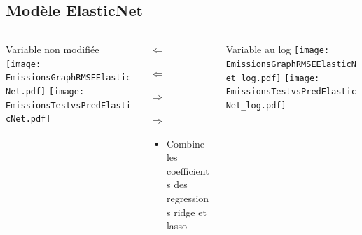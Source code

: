 \documentclass[8pt,aspectratio=169,hyperref={unicode=true}]{beamer}
\begin{document}
\subsection{Modèle ElasticNet}
\begin{frame}{\insertsubsection}
  \begin{columns}[t]
    \begin{column}{.33\textwidth}
      \centering Variable non modifiée
      \texttt{[image: EmissionsGraphRMSEElasticNet.pdf]}
      \texttt{[image: EmissionsTestvsPredElasticNet.pdf]}
    \end{column}
    \begin{column}{.33\textwidth}
      $\Longleftarrow$
      \scriptsize
      {\centering
        }
      

      \normalsize
      $\Longleftarrow$

      \raggedleft $\Longrightarrow$
      \scriptsize
      {\centering
        }
      

      \normalsize
      $\Longrightarrow$
      
      \raggedright
      \begin{itemize}
        \item Combine les coefficients des regressions ridge et lasso
      \end{itemize}
    \end{column}
    \begin{column}{.33\textwidth}
      \centering Variable au log
      \texttt{[image: EmissionsGraphRMSEElasticNet\_log.pdf]}
      \texttt{[image: EmissionsTestvsPredElasticNet\_log.pdf]}
    \end{column}
  \end{columns}
\end{frame}
\end{document}
